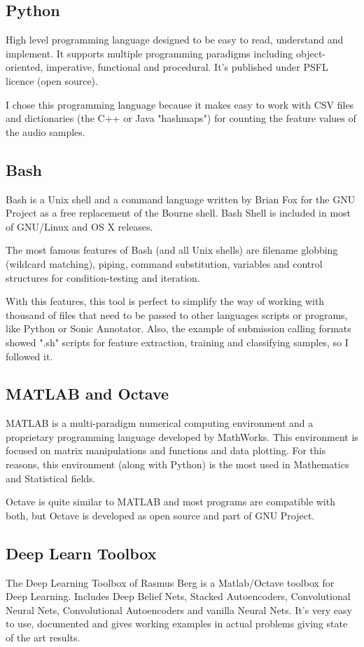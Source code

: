 \documentclass[a4paper,openany,oneside,12pt]{book}
\begin{document}
\subsection{Python}
High level programming language designed to be easy to read, understand and implement. It supports multiple programming paradigms including object-oriented, imperative, functional and procedural. It's published under PSFL licence (open source).

I chose this programming language because it makes easy to work with CSV files and dictionaries (the C++ or Java "hashmaps") for counting the feature values of the audio samples.

\subsection{Bash}
Bash is a Unix shell and a command language written by Brian Fox for the GNU Project as a free replacement of the Bourne shell. Bash Shell is included in most of GNU/Linux and OS X releases. 

The most famous features of Bash (and all Unix shells) are filename globbing (wildcard matching), piping, command substitution, variables and control structures for condition-testing and iteration.

With this features, this tool is perfect to simplify the way of working with thousand of files that need to be passed to other languages scripts or programs, like Python or Sonic Annotator. Also, the example of submission calling formats showed ".sh" scripts for feature extraction, training and classifying samples, so I followed it.

\subsection{MATLAB and Octave}
MATLAB is a multi-paradigm numerical computing environment and a proprietary programming language developed by MathWorks. This environment is focused on matrix manipulations and functions and data plotting. For this reasons, this environment (along with Python) is the most used in Mathematics and Statistical fields.

Octave is quite similar to MATLAB and most programs are compatible with both, but Octave is developed as open source and part of GNU Project.


\subsection{Deep Learn Toolbox}
The Deep Learning Toolbox of Rasmus Berg is a Matlab/Octave toolbox for Deep Learning. Includes Deep Belief Nets, Stacked Autoencoders, Convolutional Neural Nets, Convolutional Autoencoders and vanilla Neural Nets. It's very easy to use, documented and gives working examples in actual problems giving state of the art results.\cite{IMM2012-06284}
\end{document}
